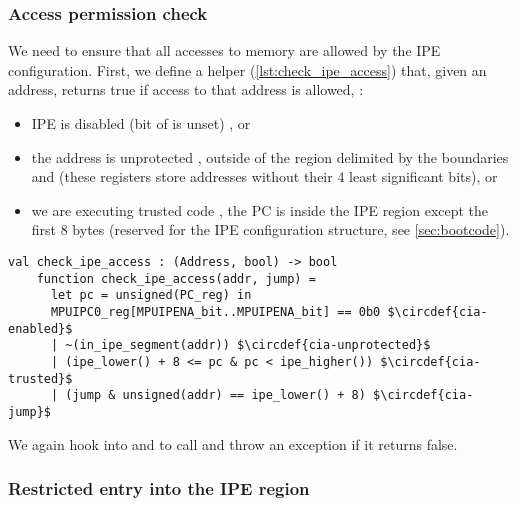 \subsubsection{Access permission check}

We need to ensure that all accesses to memory are allowed by the IPE configuration. First, we define a helper  (\cref{lst:check_ipe_access}) that, given an address, returns true if access to that address is allowed, \ie:
\begin{itemize}
\item IPE is disabled (bit  of  is unset) , or
\item the address is unprotected , \ie outside of the region delimited by the boundaries  and  (these registers store addresses without their 4 least significant bits), or
\item we are executing trusted code , \ie the PC is inside the IPE region except the first 8 bytes (reserved for the IPE configuration structure, see \cref{sec:bootcode}).
\end{itemize}

\begin{listing}[t]
  \startcstep
  \begin{lstlisting}[language=sail, mathescape=true]
    val check_ipe_access : (Address, bool) -> bool
    function check_ipe_access(addr, jump) =
      let pc = unsigned(PC_reg) in
      MPUIPC0_reg[MPUIPENA_bit..MPUIPENA_bit] == 0b0 $\circdef{cia-enabled}$
      | ~(in_ipe_segment(addr)) $\circdef{cia-unprotected}$
      | (ipe_lower() + 8 <= pc & pc < ipe_higher()) $\circdef{cia-trusted}$
      | (jump & unsigned(addr) == ipe_lower() + 8) $\circdef{cia-jump}$
  \end{lstlisting}
  \caption{Definition of . %
    }
  \label{lst:check_ipe_access}
\end{listing}

We again hook into  and  to call  and throw an  exception if it returns false.

\subsubsection{Restricted entry into the IPE region}
\label{sec:entry-point}

